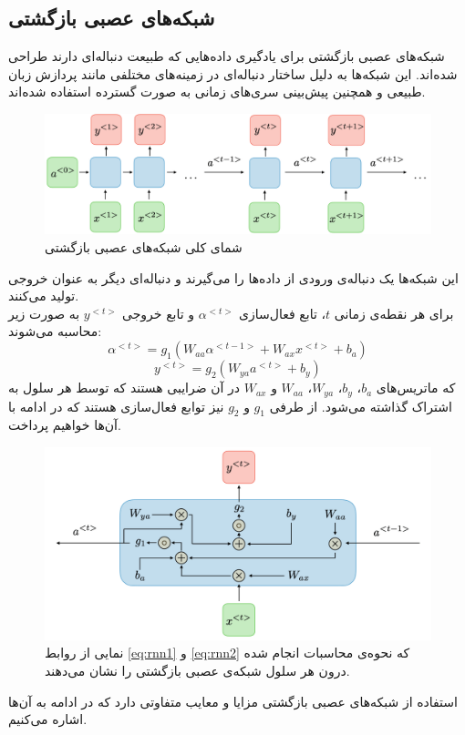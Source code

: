 \subsection{شبکه‌های عصبی بازگشتی}
شبکه‌های عصبی بازگشتی برای یادگیری داده‌هایی که طبیعت دنباله‌ای دارند طراحی شده‌اند\cite{weigend1990predicting}. این شبکه‌ها به دلیل ساختار دنباله‌ای در زمینه‌های مختلفی مانند پردازش زبان طبیعی و همچنین پیش‌بینی سری‌های زمانی به صورت گسترده استفاده شده‌اند.
\begin{figure}[!t]
	\includegraphics[width=1 \textwidth]{images/rnn_1}
	\centering
	\caption{شمای کلی شبکه‌های عصبی بازگشتی}
	\label{fig.rn1}
\end{figure}
این شبکه‌ها یک دنباله‌ی ورودی از داده‌ها را می‌گیرند و دنباله‌ای دیگر به عنوان خروجی تولید می‌کنند.\\
برای هر نقطه‌ی زمانی $t$، تابع فعال‌سازی $\alpha^{<t>}$ و تابع خروجی $y^{<t>}$ به صورت زیر محاسبه می‌شوند:
\begin{equation}
	\label{eq:rnn1}
	\alpha^{<t>} = g_1(W_{aa}\alpha^{<t-1>} + W_{ax}x^{<t>} + b_a)
\end{equation}
\vspace{-4em}
\begin{equation}
	\label{eq:rnn2}
	y^{<t>} = g_2(W_{ya}a^{<t>} + b_y)
\end{equation}
که ماتریس‌های $b_a$، $b_y$، $W_{ya}$، $W_{aa}$ و $W_{ax}$ در آن ضرایبی هستند که توسط هر سلول به اشتراک گذاشته می‌شود. از طرفی $g_1$ و $g_2$ نیز توابع فعال‌سازی هستند که در ادامه با آن‌ها خواهیم پرداخت.
\begin{figure}[!t]
	\includegraphics[width=0.8 \textwidth]{images/rnn_cell}
	\centering
	\caption{نمایی از روابط \ref{eq:rnn1} و \ref{eq:rnn2} که نحوه‌ی محاسبات انجام شده درون هر سلول شبکه‌ی عصبی بازگشتی را نشان می‌دهند.}
	\label{fig.rncell}
\end{figure}
\newpage
استفاده از شبکه‌های عصبی بازگشتی مزایا و معایب متفاوتی دارد که در ادامه به آن‌ها اشاره می‌کنیم.
